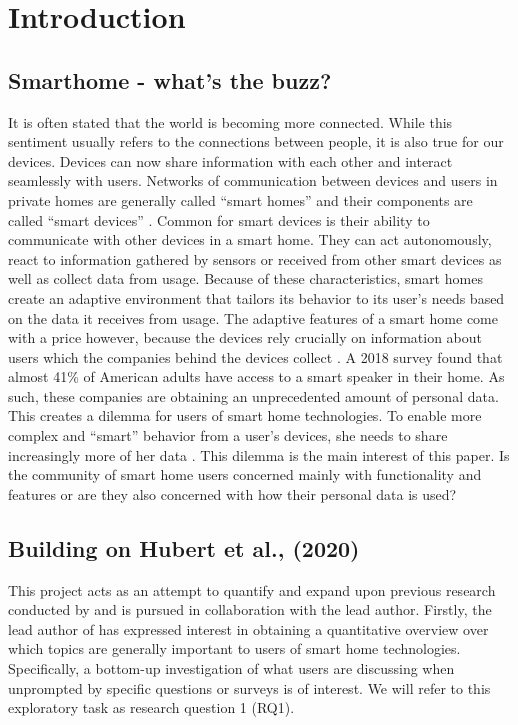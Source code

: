 \documentclass{article}
\begin{document}
    \section{Introduction}
    \subsection{Smarthome - what's the buzz?}
    It is often stated that the world is becoming more connected. While this sentiment usually refers to the connections between people, it is also true for our devices. Devices can now share information with each other and interact seamlessly with users. Networks of communication between devices and users in private homes are generally called “smart homes” and their components are called “smart devices” \cite{novak2019relationship}. Common for 
smart devices is their ability to communicate with other devices in a smart home. They can act autonomously, react to information gathered by sensors or received from other smart devices as well as collect data from usage. Because of these characteristics, smart homes create an adaptive environment that tailors its behavior to its user’s needs based on the data it receives from usage. The adaptive features of a smart home come with a price however, because the devices rely crucially on information about users which the companies behind the devices collect \cite{novak2019relationship}. A 2018 survey \cite{perez_smart_2018} found that almost 41\% of American adults have access to a smart speaker in their home. As such, these companies are obtaining an unprecedented amount of personal data. This creates a dilemma for users of smart home technologies. To enable more complex and “smart” behavior from a user’s devices, she needs to share increasingly more of her data \cite{hubert2020take}. This dilemma is the main interest of this paper. Is the community of smart home users concerned mainly with functionality and features or are they also concerned with how their personal data is used?

    \subsection{Building on Hubert et al., (2020)}
    This project acts as an attempt to quantify and expand upon previous research conducted by  and is pursued in collaboration with the lead author. Firstly, the lead author of  has expressed interest in obtaining a quantitative overview over which topics are generally important to users of smart home technologies. Specifically, a bottom-up investigation of what users are discussing when unprompted by specific questions or surveys is of interest. We will refer to this exploratory task as research question 1 (RQ1). 
\end{document}
